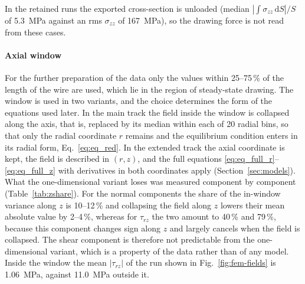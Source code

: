 In the retained runs the exported cross-section is unloaded (median $|\int\sigma_{zz}\,\mathrm{d}S|/S$ of 5.3~MPa against an rms $\sigma_{zz}$ of 167~MPa), so the drawing force is not read from these cases. %

\paragraph{Axial window}
For the further preparation of the data only the values within 25--75\,\% of the length of the wire are used, which lie in the region of steady-state drawing. %
The window is used in two variants, and the choice determines the form of the equations used later. In the main track the field inside the window is collapsed along the axis, that is, replaced by its median within each of 20 radial bins, so that only the radial coordinate $r$ remains and the equilibrium condition enters in its radial form, Eq.~\eqref{eq:eq_red}. In the extended track the axial coordinate is kept, the field is described in $(r,z)$, and the full equations \eqref{eq:eq_full_r}--\eqref{eq:eq_full_z} with derivatives in both coordinates apply (Section~\ref{sec:models}). What the one-dimensional variant loses was measured component by component (Table~\ref{tab:zshare}). For the normal components the share of the in-window variance along $z$ is 10--12\,\% and collapsing the field along $z$ lowers their mean absolute value by 2--4\,\%, whereas for $\tau_{rz}$ the two amount to 40\,\% and 79\,\%, because this component changes sign along $z$ and largely cancels when the field is collapsed. %
The shear component is therefore not predictable from the one-dimensional variant, which is a property of the data rather than of any model. Inside the window the mean $|\tau_{rz}|$ of the run shown in Fig.~\ref{fig:fem-fields} is 1.06~MPa, against 11.0~MPa outside it. %

